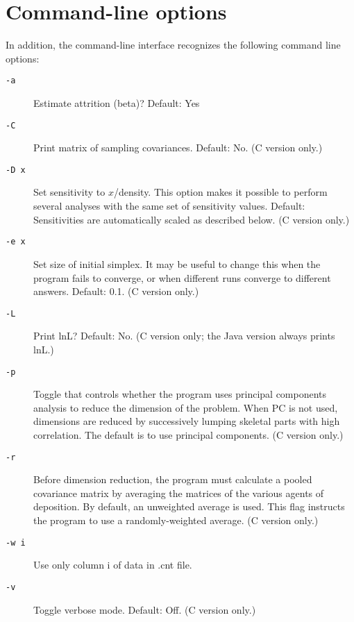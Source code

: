 \section{Command-line options}

In addition, the command-line interface recognizes the following
command line options:
\begin{description}

\item[\texttt{-a}]
Estimate attrition (beta)? Default: Yes

\item[\texttt{-C}]
Print matrix of sampling covariances. Default: No. (C version only.) 

\item[\texttt{-D x}] Set sensitivity to $x$/density.  This
  option makes it possible to perform several analyses with the same set of
  sensitivity values.  Default: Sensitivities are automatically scaled as
  described below. (C version only.) 
  
\item[\texttt{-e x}] Set size of initial simplex.  It may be
  useful to change this when the program fails to converge, or when different
  runs converge to different answers. Default: 0.1.
  (C version only.) 

\item[\texttt{-L}]
Print lnL? Default: No.  (C version only; the Java version always prints lnL.) 

\item[\texttt{-p}]
Toggle that controls whether the program uses principal
components analysis to reduce the dimension of the problem.
When PC is not used, dimensions are reduced by successively
lumping skeletal parts with high correlation.  The default is
to use principal components. (C version only.)

\item[\texttt{-r}]
Before dimension reduction, the program must calculate a
pooled covariance matrix by averaging the matrices of the
various agents of deposition.  By default, an unweighted 
average is used.  This flag instructs the program to use
a randomly-weighted average. (C version only.)

\item[\texttt{-w i}]
Use only column i of data in .cnt file.

\item[\texttt{-v}]
Toggle verbose mode.  Default: Off. (C version only.)
\end{description}
